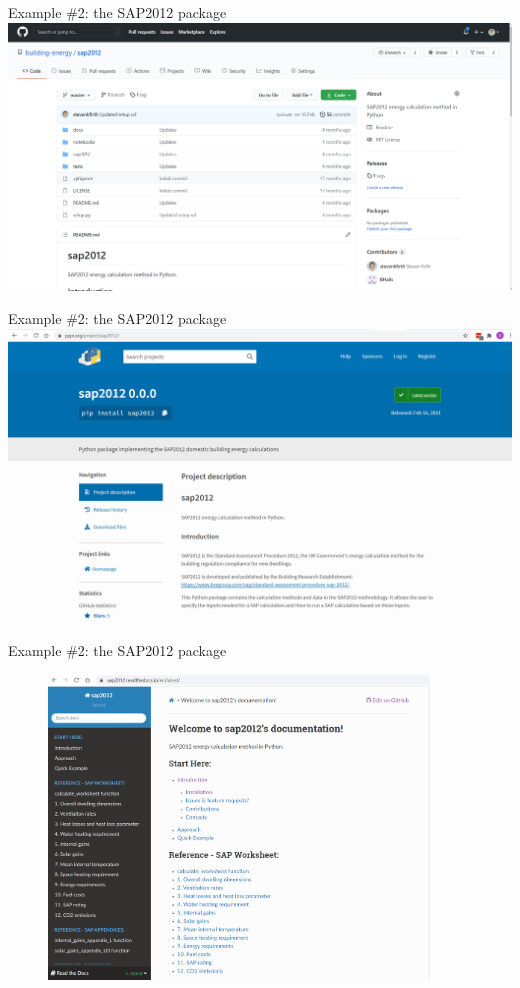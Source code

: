 \documentclass{beamer}
\begin{document}
	\begin{frame}{Example \#2: the SAP2012 package}
		\includegraphics[width=1\textwidth,keepaspectratio]{github_sap_2012.png}
	\end{frame}

	\begin{frame}{Example \#2: the SAP2012 package}
		\includegraphics[width=1\textwidth,keepaspectratio]{pypi_sap_2012.png}
	\end{frame}

	\begin{frame}{Example \#2: the SAP2012 package}
		\begin{figure}
			\includegraphics[width=0.9\textwidth,keepaspectratio]{readthedocs_sap_2012.png}
		\end{figure}
	\end{frame}
\end{document}
